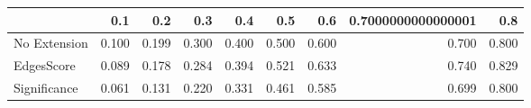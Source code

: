\begin{tabular}{lrrrrrrrr}
\toprule
{} &   0.1 &   0.2 &   0.3 &   0.4 &   0.5 &   0.6 & 0.7000000000000001 &   0.8 \\
\midrule
No Extension & 0.100 & 0.199 & 0.300 & 0.400 & 0.500 & 0.600 &              0.700 & 0.800 \\
EdgesScore   & 0.089 & 0.178 & 0.284 & 0.394 & 0.521 & 0.633 &              0.740 & 0.829 \\
Significance & 0.061 & 0.131 & 0.220 & 0.331 & 0.461 & 0.585 &              0.699 & 0.800 \\
\bottomrule
\end{tabular}
